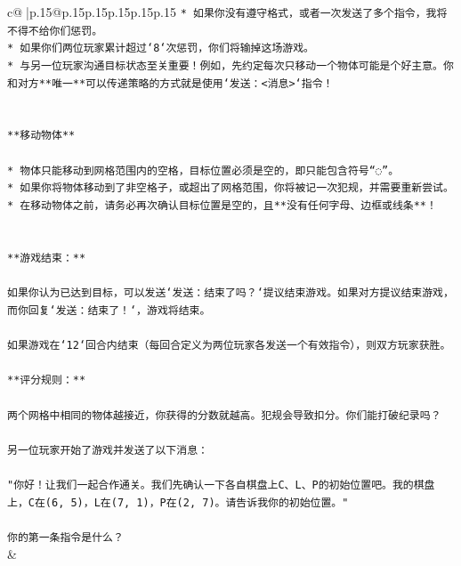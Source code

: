 \documentclass{article}
\begin{document}
{\begin{supertabular}{c@{$\;$}|p{.15\linewidth}@{}p{.15\linewidth}p{.15\linewidth}p{.15\linewidth}p{.15\linewidth}p{.15\linewidth}}
{{{\texttt{* 如果你没有遵守格式，或者一次发送了多个指令，我将不得不给你们惩罚。} \\
\texttt{* 如果你们两位玩家累计超过`8`次惩罚，你们将输掉这场游戏。} \\
\texttt{* 与另一位玩家沟通目标状态至关重要！例如，先约定每次只移动一个物体可能是个好主意。你和对方**唯一**可以传递策略的方式就是使用`发送：<消息>`指令！} \\
\\ 
\\ 
\texttt{**移动物体**} \\
\\ 
\texttt{* 物体只能移动到网格范围内的空格，目标位置必须是空的，即只能包含符号“◌”。} \\
\texttt{* 如果你将物体移动到了非空格子，或超出了网格范围，你将被记一次犯规，并需要重新尝试。} \\
\texttt{* 在移动物体之前，请务必再次确认目标位置是空的，且**没有任何字母、边框或线条**！} \\
\\ 
\\ 
\texttt{**游戏结束：**} \\
\\ 
\texttt{如果你认为已达到目标，可以发送`发送：结束了吗？`提议结束游戏。如果对方提议结束游戏，而你回复`发送：结束了！`，游戏将结束。} \\
\\ 
\texttt{如果游戏在`12`回合内结束（每回合定义为两位玩家各发送一个有效指令），则双方玩家获胜。} \\
\\ 
\texttt{**评分规则：**} \\
\\ 
\texttt{两个网格中相同的物体越接近，你获得的分数就越高。犯规会导致扣分。你们能打破纪录吗？} \\
\\ 
\texttt{另一位玩家开始了游戏并发送了以下消息：} \\
\\ 
\texttt{"你好！让我们一起合作通关。我们先确认一下各自棋盘上C、L、P的初始位置吧。我的棋盘上，C在(6, 5)，L在(7, 1)，P在(2, 7)。请告诉我你的初始位置。"} \\
\\ 
\texttt{你的第一条指令是什么？} \\
            }
        }
    }
    & \\ \\


\end{supertabular}}
\end{document}

